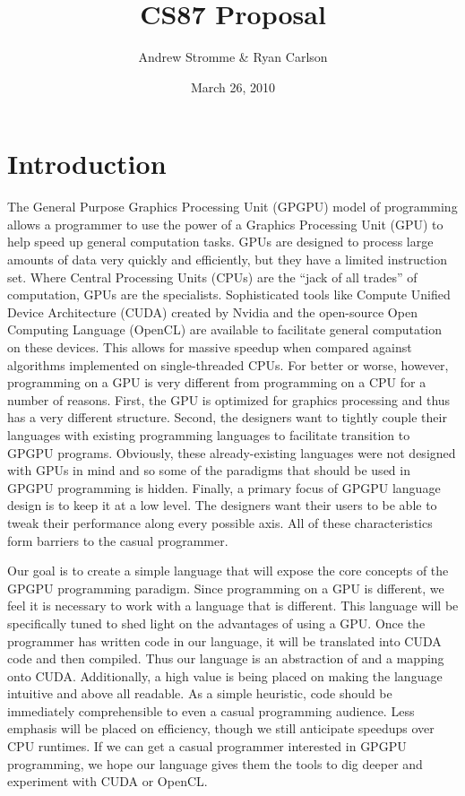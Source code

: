 \documentclass{article}
\begin{document}
\title{CS87 Proposal}
\author{Andrew Stromme \& Ryan Carlson}
\date{March 26, 2010}
\maketitle

\section{Introduction}

The General Purpose Graphics Processing Unit (GPGPU) model of programming allows a programmer to use the power of a Graphics Processing Unit (GPU) to help speed up general computation tasks. GPUs are designed to process large amounts of data very quickly and efficiently, but they have a limited instruction set. Where Central Processing Units (CPUs) are the ``jack of all trades'' of computation, GPUs are the specialists. Sophisticated tools like Compute Unified Device Architecture (CUDA) created by Nvidia and the open-source Open Computing Language (OpenCL) are available to facilitate general computation on these devices. This allows for massive speedup when compared against algorithms implemented on single-threaded CPUs. For better or worse, however, programming on a GPU is very different from programming on a CPU for a number of reasons. First, the GPU is optimized for graphics processing and thus has a very different structure. Second, the designers want to tightly couple their languages with existing programming languages to facilitate transition to GPGPU programs. Obviously, these already-existing languages were not designed with GPUs in mind and so some of the paradigms that should be used in GPGPU programming is hidden. Finally, a primary focus of GPGPU language design is to keep it at a low level. The designers want their users to be able to tweak their performance along every possible axis. All of these characteristics form barriers to the casual programmer.

Our goal is to create a simple language that will expose the core concepts of the GPGPU programming paradigm. Since programming on a GPU is different, we feel it is necessary to work with a language that is different. This language will be specifically tuned to shed light on the advantages of using a GPU. Once the programmer has written code in our language, it will be translated into CUDA code and then compiled. Thus our language is an abstraction of and a mapping onto CUDA. Additionally, a high value is being placed on making the language intuitive and above all readable. As a simple heuristic, code should be immediately comprehensible to even a casual programming audience. Less emphasis will be placed on efficiency, though we still anticipate speedups over CPU runtimes. If we can get a casual programmer interested in GPGPU programming, we hope our language gives them the tools to dig deeper and experiment with CUDA or OpenCL.
\end{document}
